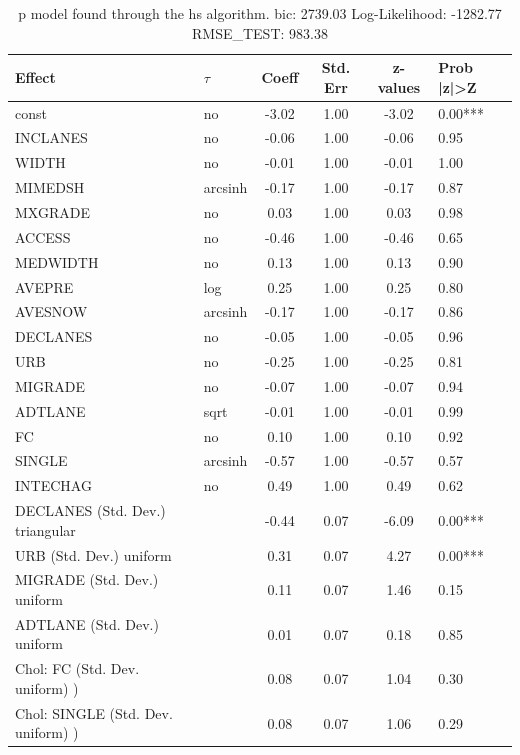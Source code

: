 \begin{table}
	\caption{p model found through the hs algorithm. bic: 2739.03 Log-Likelihood: -1282.77 RMSE_TEST: 983.38}
	\begin{center}
		\begin{tabular}{|l|l|c|c|c|l|}
			\hline
			Effect & $\tau$ & Coeff & Std. Err & z-values & Prob |z|>Z \\
			\hline
			const & no & -3.02 & 1.00 & -3.02 & 0.00*** \\
			\hline
			INCLANES & no & -0.06 & 1.00 & -0.06 & 0.95 \\
			\hline
			WIDTH & no & -0.01 & 1.00 & -0.01 & 1.00 \\
			\hline
			MIMEDSH & arcsinh & -0.17 & 1.00 & -0.17 & 0.87 \\
			\hline
			MXGRADE & no & 0.03 & 1.00 & 0.03 & 0.98 \\
			\hline
			ACCESS & no & -0.46 & 1.00 & -0.46 & 0.65 \\
			\hline
			MEDWIDTH & no & 0.13 & 1.00 & 0.13 & 0.90 \\
			\hline
			AVEPRE & log & 0.25 & 1.00 & 0.25 & 0.80 \\
			\hline
			AVESNOW & arcsinh & -0.17 & 1.00 & -0.17 & 0.86 \\
			\hline
			DECLANES & no & -0.05 & 1.00 & -0.05 & 0.96 \\
			\hline
			URB & no & -0.25 & 1.00 & -0.25 & 0.81 \\
			\hline
			MIGRADE & no & -0.07 & 1.00 & -0.07 & 0.94 \\
			\hline
			ADTLANE & sqrt & -0.01 & 1.00 & -0.01 & 0.99 \\
			\hline
			FC & no & 0.10 & 1.00 & 0.10 & 0.92 \\
			\hline
			SINGLE & arcsinh & -0.57 & 1.00 & -0.57 & 0.57 \\
			\hline
			INTECHAG & no & 0.49 & 1.00 & 0.49 & 0.62 \\
			\hline
			DECLANES (Std. Dev.) triangular &  & -0.44 & 0.07 & -6.09 & 0.00*** \\
			\hline
			URB (Std. Dev.) uniform &  & 0.31 & 0.07 & 4.27 & 0.00*** \\
			\hline
			MIGRADE (Std. Dev.) uniform &  & 0.11 & 0.07 & 1.46 & 0.15 \\
			\hline
			ADTLANE (Std. Dev.) uniform &  & 0.01 & 0.07 & 0.18 & 0.85 \\
			\hline
			 Chol: FC (Std. Dev. uniform) ) &  & 0.08 & 0.07 & 1.04 & 0.30 \\
			\hline
			 Chol: SINGLE (Std. Dev. uniform) ) &  & 0.08 & 0.07 & 1.06 & 0.29 \\

\end{tabular}
\end{center}
\end{table}

